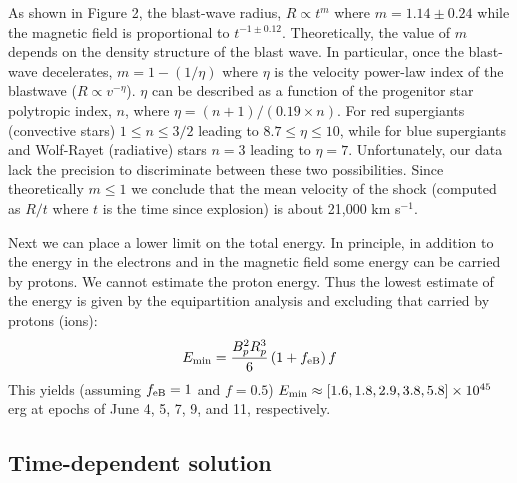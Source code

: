\documentclass{emulateapj}
\begin{document}
As shown in Figure 2, the
blast-wave radius, $R\propto t^m$ where $m=1.14\pm0.24$ while the magnetic field
is proportional to $t^{-1\pm 0.12}$. 
Theoretically, the value of $m$ depends on the density structure of
the blast wave. In particular, once the blast-wave decelerates,
$m=1-(1/ \eta)$ where $\eta$ is the velocity power-law index of the
blastwave ($R\propto v^{-\eta}$). $\eta$ can be described as a function
of the progenitor star polytropic index, $n$, where
$\eta=(n+1)/(0.19\times n)$.
For red supergiants (convective stars) $1 \leq n \leq 3/2$ leading to $8.7\leq \eta \leq
10$, 
while for blue supergiants and
Wolf-Rayet (radiative) stars $n=3$ leading to $\eta=7$. Unfortunately, our data
lack the precision to discriminate between these two possibilities.
Since theoretically $m\le 1$ we conclude that the mean velocity of the shock
(computed as $R/t$ where $t$ is the time since explosion) is 
about 21,000 km s$^{-1}$.


Next we can place a lower limit on the total energy. In
principle, in addition to the energy in the electrons and in the
magnetic field some energy can be carried by protons. 
We cannot
estimate the proton energy. Thus the lowest estimate of the energy is
given
by the equipartition analysis and excluding that carried by protons (ions): 
\begin{equation} 
E_{\rm min}=\frac{B_{p}^{2}R_{p}^{3}}{6}\left(1+f_{\rm eB}\right)f
\end{equation}
This yields (assuming $f_{\rm eB}=1$ and $f=0.5$) $E_{\rm min}\approx [1.6, 1.8, 2.9, 3.8, 5.8]\times 10^{45}$
erg at epochs of June 4, 5, 7, 9, and 11, respectively.

\subsection{Time-dependent solution}
\end{document}
